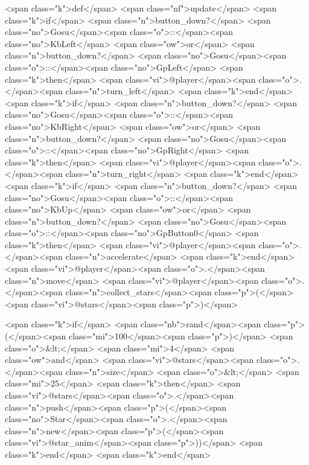 \begin{rawhtml}
  <span class="k">def</span> <span class="nf">update</span>
    <span class="k">if</span> <span class="n">button_down?</span> <span class="no">Gosu</span><span class="o">::</span><span class="no">KbLeft</span> <span class="ow">or</span> <span class="n">button_down?</span> <span class="no">Gosu</span><span class="o">::</span><span class="no">GpLeft</span> <span class="k">then</span>
      <span class="vi">@player</span><span class="o">.</span><span class="n">turn_left</span>
    <span class="k">end</span>
    <span class="k">if</span> <span class="n">button_down?</span> <span class="no">Gosu</span><span class="o">::</span><span class="no">KbRight</span> <span class="ow">or</span> <span class="n">button_down?</span> <span class="no">Gosu</span><span class="o">::</span><span class="no">GpRight</span> <span class="k">then</span>
      <span class="vi">@player</span><span class="o">.</span><span class="n">turn_right</span>
    <span class="k">end</span>
    <span class="k">if</span> <span class="n">button_down?</span> <span class="no">Gosu</span><span class="o">::</span><span class="no">KbUp</span> <span class="ow">or</span> <span class="n">button_down?</span> <span class="no">Gosu</span><span class="o">::</span><span class="no">GpButton0</span> <span class="k">then</span>
      <span class="vi">@player</span><span class="o">.</span><span class="n">accelerate</span>
    <span class="k">end</span>
    <span class="vi">@player</span><span class="o">.</span><span class="n">move</span>
    <span class="vi">@player</span><span class="o">.</span><span class="n">collect_stars</span><span class="p">(</span><span class="vi">@stars</span><span class="p">)</span>
    
    <span class="k">if</span> <span class="nb">rand</span><span class="p">(</span><span class="mi">100</span><span class="p">)</span> <span class="o">&lt;</span> <span class="mi">4</span> <span class="ow">and</span> <span class="vi">@stars</span><span class="o">.</span><span class="n">size</span> <span class="o">&lt;</span> <span class="mi">25</span> <span class="k">then</span>
      <span class="vi">@stars</span><span class="o">.</span><span class="n">push</span><span class="p">(</span><span class="no">Star</span><span class="o">.</span><span class="n">new</span><span class="p">(</span><span class="vi">@star_anim</span><span class="p">))</span>
    <span class="k">end</span>
  <span class="k">end</span>


\end{rawhtml}
